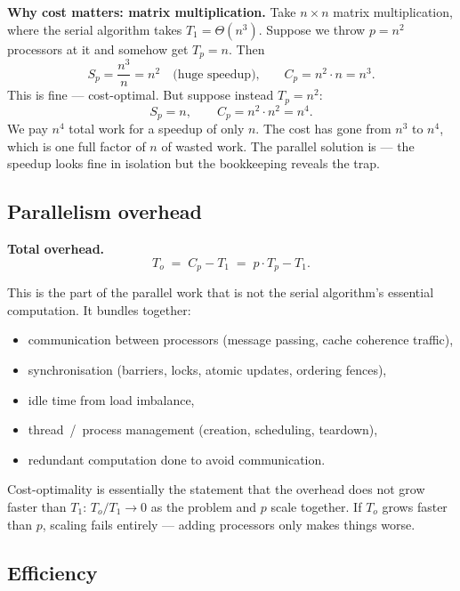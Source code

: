 \begin{ppexample}
\textbf{Why cost matters: matrix multiplication.}
Take $n \times n$ matrix multiplication, where the serial algorithm takes
$T_1 = \Theta(n^{3})$. Suppose we throw $p = n^{2}$ processors at it and
somehow get $T_p = n$. Then
\[
S_p = \frac{n^{3}}{n} = n^{2} \quad\text{(huge speedup),}
\qquad
C_p = n^{2}\cdot n = n^{3}.
\]
This is fine --- cost-optimal. But suppose instead $T_p = n^{2}$:
\[
S_p = n, \qquad C_p = n^{2}\cdot n^{2} = n^{4}.
\]
We pay $n^{4}$ total work for a speedup of only $n$. The cost has gone from
$n^{3}$ to $n^{4}$, which is one full factor of $n$ of wasted work. The
parallel solution is  --- the speedup looks fine in
isolation but the bookkeeping reveals the trap.
\end{ppexample}

\subsection{Parallelism overhead}

\begin{ppdefn}
\textbf{Total overhead.}
\[
T_o \;=\; C_p - T_1 \;=\; p \cdot T_p - T_1.
\]
\end{ppdefn}

This is the part of the parallel work that is not the serial algorithm's
essential computation. It bundles together:
\begin{itemize}
  \item communication between processors (message passing, cache coherence
        traffic),
  \item synchronisation (barriers, locks, atomic updates, ordering fences),
  \item idle time from load imbalance,
  \item thread~/~process management (creation, scheduling, teardown),
  \item redundant computation done to avoid communication.
\end{itemize}

Cost-optimality is essentially the statement that the overhead does not
grow faster than $T_1$: $T_o/T_1 \to 0$ as the problem and $p$ scale together.
If $T_o$ grows faster than $p$, scaling fails entirely --- adding processors
only makes things worse.

\subsection{Efficiency}

